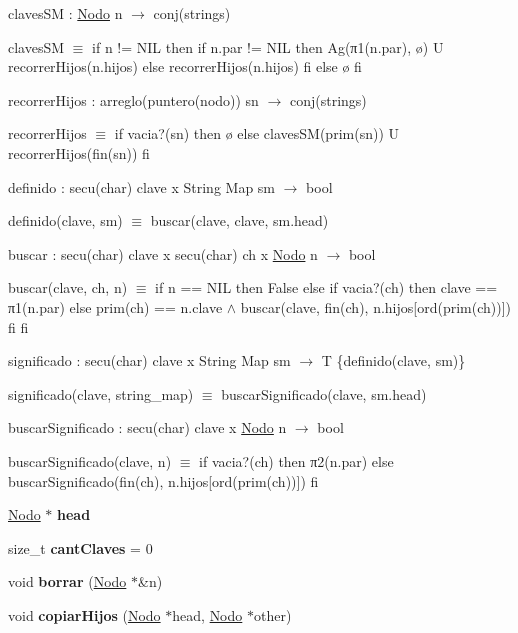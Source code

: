 claves\+SM \+: \mbox{\hyperlink{structstring__map_1_1Nodo}{Nodo}} n $\to$ conj(strings)

claves\+SM $\equiv$ if n != N\+IL then if n.\+par != N\+IL then Ag(π1(n.\+par), ø) U recorrer\+Hijos(n.\+hijos) else recorrer\+Hijos(n.\+hijos) fi else ø fi

recorrer\+Hijos \+: arreglo(puntero(nodo)) sn $\to$ conj(strings)

recorrer\+Hijos $\equiv$ if vacia?(sn) then ø else claves\+S\+M(prim(sn)) U recorrer\+Hijos(fin(sn)) fi

definido \+: secu(char) clave x String Map sm $\to$ bool

definido(clave, sm) $\equiv$ buscar(clave, clave, sm.\+head)

buscar \+: secu(char) clave x secu(char) ch x \mbox{\hyperlink{structstring__map_1_1Nodo}{Nodo}} n $\to$ bool

buscar(clave, ch, n) $\equiv$ if n == N\+IL then False else if vacia?(ch) then clave == π1(n.\+par) else prim(ch) == n.\+clave $\land$ buscar(clave, fin(ch), n.\+hijos\mbox{[}ord(prim(ch))\mbox{]}) fi fi

significado \+: secu(char) clave x String Map sm $\to$ T \{definido(clave, sm)\}

significado(clave, string\+\_\+map) $\equiv$ buscar\+Significado(clave, sm.\+head)

buscar\+Significado \+: secu(char) clave x \mbox{\hyperlink{structstring__map_1_1Nodo}{Nodo}} n $\to$ bool

buscar\+Significado(clave, n) $\equiv$ if vacia?(ch) then π2(n.\+par) else buscar\+Significado(fin(ch), n.\+hijos\mbox{[}ord(prim(ch))\mbox{]}) fi \begin{DoxyCompactItemize}
\item 
\mbox{\label{classstring__map_a4e60d9ce91c1b8c217b626fcaf8d95da}} 
\mbox{\hyperlink{structstring__map_1_1Nodo}{Nodo}} $\ast$ {\bfseries head}
\item 
\mbox{\label{classstring__map_a1a4b844fe3d37c0ea5602e2bc7b1d6f2}} 
size\+\_\+t {\bfseries cant\+Claves} = 0
\item 
\mbox{\label{classstring__map_adad31fdfbdd23045b03a70bb81f9fa15}} 
void {\bfseries borrar} (\mbox{\hyperlink{structstring__map_1_1Nodo}{Nodo}} $\ast$\&n)
\item 
\mbox{\label{classstring__map_a8644f3f069fedb8f3b94ccd6704eafa2}} 
void {\bfseries copiar\+Hijos} (\mbox{\hyperlink{structstring__map_1_1Nodo}{Nodo}} $\ast$head, \mbox{\hyperlink{structstring__map_1_1Nodo}{Nodo}} $\ast$other)
\end{DoxyCompactItemize}


